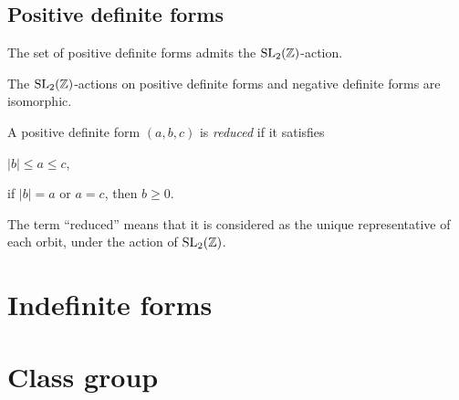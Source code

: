 \documentclass{../exp}
\begin{document}
\subsection{Positive definite forms}
\begin{prop}
The set of positive definite forms admits the $\mathrm{SL}_2(\mathbb{Z})$-action.
\end{prop}
\begin{prop}
The $\mathrm{SL}_2(\mathbb{Z})$-actions on positive definite forms and negative definite forms are isomorphic.
\end{prop}

\begin{defn}
A positive definite form $(a,b,c)$ is \emph{reduced} if it satisfies
\begin{cond}
\item $|b|\le a\le c$,
\item if $|b|=a$ or $a=c$, then $b\ge0$.
\end{cond}
\end{defn}
The term ``reduced'' means that it is considered as the unique representative of each orbit, under the action of $\mathrm{SL}_2(\mathbb{Z})$.



\section{Indefinite forms}


\section{Class group}
\end{document}
